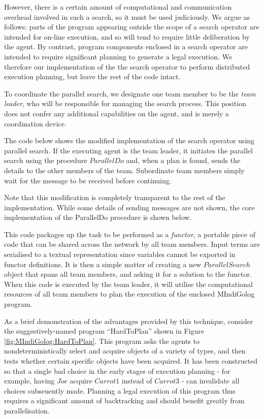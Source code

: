 However, there is a certain amount of computational and communication
overhead involved in such a search, so it must be used judiciously.
We argue as follows: parts of the program appearing outside the scope
of a search operator are intended for on-line execution, and so will
tend to require little deliberation by the agent. By contrast, program
components enclosed in a search operator are intended to require significant
planning to generate a legal execution. We therefore our implementation
of the the search operator to perform distributed execution planning,
but leave the rest of the code intact.

To coordinate the parallel search, we designate one team member to
be the \emph{team leader}, who will be responsible for managing the
search process. This position does not confer any additional capabilities
on the agent, and is merely a coordination device.

The code below shows the modified implementation of the search operator
using parallel search. If the executing agent is the team leader,
it initiates the parallel search using the procedure $ParallelDo$
and, when a plan is found, sends the details to the other members
of the team. Subordinate team members simply wait for the message
to be received before continuing.


Note that this modification is completely transparent to the rest
of the implementation. While some details of sending messages are
not shown, the core implementation of the ParallelDo procedure is
shown below.

This code packages up the task to be performed as a \emph{functor},
a portable piece of code that can be shared across the network by
all team members. Input terms are serialised to a textual representation
since variables cannot be exported in functor definitions. It is then
a simple matter of creating a new $ParallelSearch$ object that spans
all team members, and asking it for a solution to the functor. When
this code is executed by the team leader, it will utilise the computational
resources of all team members to plan the execution of the enclosed
MIndiGolog program.


As a brief demonstration of the advantages provided by this technique,
consider the suggestively-named program {}``HardToPlan'' shown in
Figure \ref{fig:MIndiGolog:HardToPlan}. This program asks the agents
to nondeterministically select and acquire objects of a variety of
types, and then tests whether certain specific objects have been acquired.
It has been constructed so that a single bad choice in the early stages
of execution planning - for example, having $Joe$ acquire $Carrot1$
instead of $Carrot3$ - can invalidate all choices subseuently made.
Planning a legal execution of this program thus requires a significant
amount of backtracking and should benefit greatly from parallelisation.


